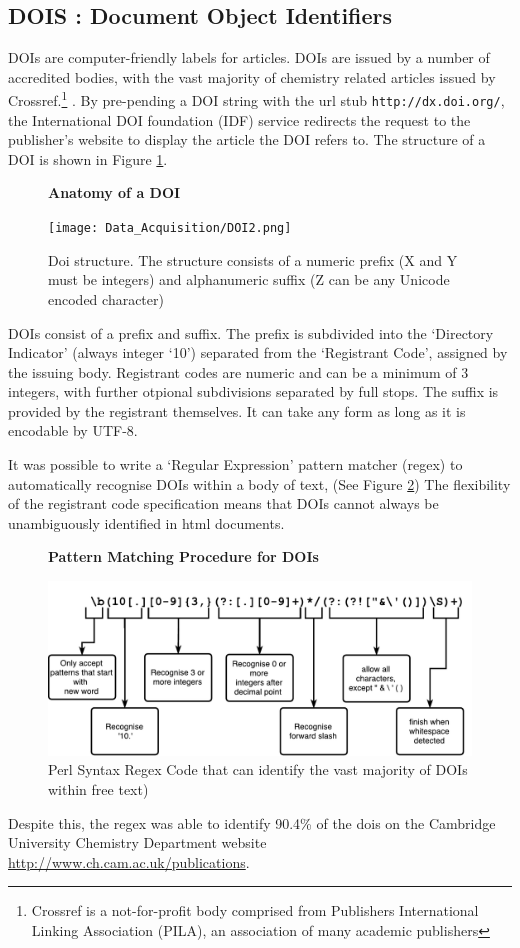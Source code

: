 \subsection{DOIS : Document Object Identifiers}
\label{sec:DOI}
DOIs are computer-friendly labels for articles. DOIs are issued by a number of accredited bodies, with the vast majority of chemistry related articles issued by Crossref.\footnote{Crossref is a not-for-profit body comprised from Publishers International Linking Association (PILA), an association of many academic publishers} \cite{crossref-formation}. By pre-pending a DOI string with the url stub \texttt{http://dx.doi.org/}, the International DOI foundation (IDF) service redirects the request to the publisher's website to display the article the DOI refers to. The structure of a DOI is shown in Figure \ref{fig:DOI}.
\begin{figure}[H]
    \centering
    \textbf{Anatomy of a DOI}\par\medskip
    \texttt{[image: Data\_Acquisition/DOI2.png]}
    \caption{Doi structure. The structure consists of a numeric prefix (X and Y must be integers) and alphanumeric suffix (Z can be any Unicode encoded character) \label{fig:DOI}}
\end{figure}
DOIs consist of a prefix and suffix. The prefix is subdivided into the ‘Directory Indicator’ (always integer ‘10’) separated from the ‘Registrant Code’, assigned by the issuing body. Registrant codes are numeric and can be a minimum of 3 integers, with further otpional subdivisions separated by full stops. The suffix is provided by the registrant themselves. It can take any form as long as it is encodable by UTF-8.


It was possible to write a `Regular Expression' pattern matcher (regex) to automatically recognise DOIs within a body of text, (See Figure \ref{fig:REGEX}) The flexibility of the registrant code specification means that DOIs cannot always be unambiguously identified in html documents. 
\begin{figure}[H]
    \centering
    \textbf{Pattern Matching Procedure for DOIs}\par\medskip
    \includegraphics[width=\textwidth]{Data_Acquisition/Regex.pdf}
    \caption{Perl Syntax Regex Code that can identify the vast majority of DOIs within free text) \label{fig:REGEX}}
\end{figure}
Despite this, the regex was able to identify 90.4\% of the dois on the Cambridge University Chemistry Department website \url{http://www.ch.cam.ac.uk/publications}. 
